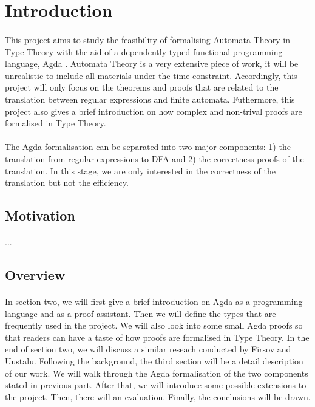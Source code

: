\documentclass[twoside,openright,final]{bhamthesis}
\begin{document}
\section{Introduction}
\paragraph{} This project aims to study the feasibility of formalising
Automata Theory \cite{aho1972} in Type Theory with the aid of a dependently-typed
functional programming language, Agda \cite{agdawiki2016}. Automata Theory is a very
extensive piece of work, it will be unrealistic to include all
materials under the time constraint. Accordingly, this project will only focus on the theorems and
proofs that are related to the translation between regular expressions
and finite automata. Futhermore, this project also gives a brief introduction
on how complex and non-trival proofs are formalised in Type
Theory. 

\paragraph{} The Agda formalisation can be separated into two major
components: 1) the translation from regular expressions to DFA and 2)
the correctness proofs of the translation. In this stage, we are only
interested in the correctness of the translation but not the efficiency. 

\subsection{Motivation}
\paragraph{} ... 

\subsection{Overview}
\paragraph{} In section two, we will first give a brief introduction on
Agda as a programming language and as a proof assistant. Then we will
define the types that are frequently used in the project. We
will also look into some small Agda proofs so that readers can
have a taste of how proofs are formalised in Type Theory. In the end
of section two, we will discuss a similar reseach \cite{firsov2013}
conducted by Firsov and Uustalu. Following the
background, the third section will be a detail description of our
work. We will walk through the Agda
formalisation of the two components stated in previous part. After
that, we will introduce some possible extensions to the project. Then,
there will an evaluation. Finally, the conclusions will be drawn. 
\end{document}
